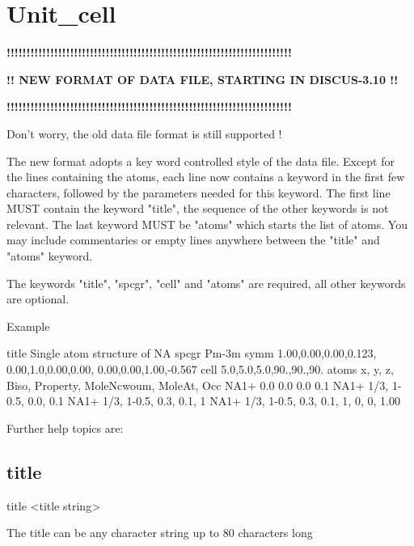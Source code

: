 \section{Unit\_cell}
{\bf !!!!!!!!!!!!!!!!!!!!!!!!!!!!!!!!!!!!!!!!!!!!!!!!!!!!!!!!!!!!!!!!!!!!!!!! \par }
{\bf !!          NEW FORMAT OF DATA FILE, STARTING IN DISCUS-3.10          !! \par }
{\bf !!!!!!!!!!!!!!!!!!!!!!!!!!!!!!!!!!!!!!!!!!!!!!!!!!!!!!!!!!!!!!!!!!!!!!!! \par }
\par
\vspace{3pt}
Don't worry, the old data file format is still supported ! 
\par
The new format adopts a key word controlled style of the data file. 
Except for the lines containing the atoms, each line now contains a 
keyword in the first few characters, followed by the parameters needed 
for this keyword. 
The first line MUST contain the keyword "title", the sequence of the 
other keywords is not relevant. 
The last keyword MUST be "atoms" which starts the list of atoms. 
You may include commentaries or empty lines anywhere between the 
"title" and "atoms" keyword. 
\par
The keywords "title", "spcgr", "cell" and "atoms" are required, all 
other keywords are optional. 
\par
Example 
\par
\begin{MacVerbatim}
title Single atom structure of NA
spcgr Pm-3m
symm  1.00,0.00,0.00,0.123, 0.00,1.0,0.00,0.00, 0.00,0.00,1.00,-0.567
cell  5.0,5.0,5.0,90.,90.,90.
atoms x,    y,    z,  Biso, Property, MoleNcwoum, MoleAt, Occ
NA1+  0.0   0.0   0.0 0.1
NA1+  1/3, 1-0.5, 0.0, 0.1
NA1+  1/3, 1-0.5, 0.3, 0.1,  1
NA1+  1/3, 1-0.5, 0.3, 0.1,  1,  0,  0,   1.00
\end{MacVerbatim}
Further help topics are: 
\par
\subsection*{title}
\begin{MacVerbatim}
title <title string>
\end{MacVerbatim}
The title can be any character string up to 80 characters long 
